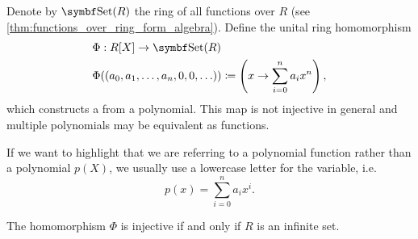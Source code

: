 \begin{definition}\label{def:polynomial_function}
  Denote by \( \Cat{Set}(R) \) the ring of all functions over \( R \) (see \cref{thm:functions_over_ring_form_algebra}). Define the unital ring homomorphism
  \begin{align*}
    &\Phi: R[X] \to \Cat{Set}(R) \\
    &\Phi((a_0, a_1, \ldots, a_n, 0, 0, \ldots)) \coloneqq \left( x \to \sum_{i=0}^n a_i x^n \right),
  \end{align*}
  which constructs a  from a polynomial. This map is not injective in general and multiple polynomials may be equivalent as functions.

  If we want to highlight that we are referring to a polynomial function rather than a polynomial \( p(X) \), we usually use a lowercase letter for the variable, i.e.
  \begin{equation*}
    p(x) = \sum_{i=0}^n a_i x^i.
  \end{equation*}

  The homomorphism \( \Phi \) is injective if and only if \( R \) is an infinite set.
\end{definition}
